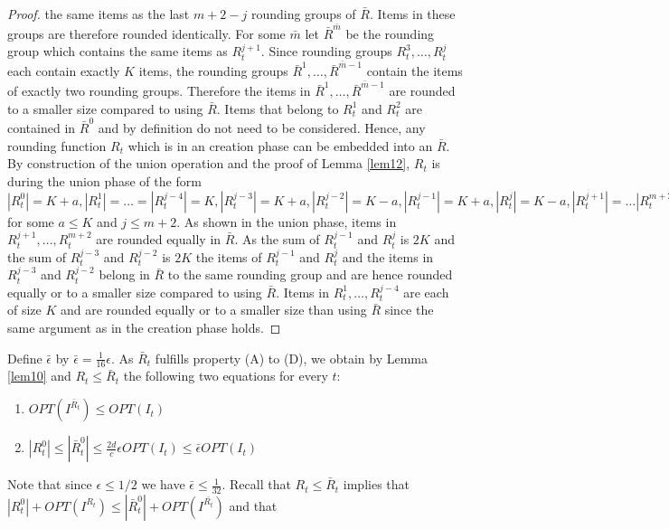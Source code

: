 \documentclass[a4paper,11pt]{article}
\begin{document}
\begin{proof}
	the same items as the last $m+2 - j$ rounding groups of $\bar{R}$.
	Items in these groups are therefore rounded identically.
	For some $\bar{m}$ let $\bar{R}^{\bar{m}}$ be the rounding group which contains the same items as $R_{t}^{j+1}$.
	Since rounding groups $R_{t}^3, \ldots ,R_{t}^j$ each contain exactly $K$ items, the rounding groups 
	$\bar{R}^1, \ldots ,\bar{R}^{\bar{m}- 1}$ contain the items of exactly two rounding groups. Therefore the items
	in $\bar{R}^1, \ldots ,\bar{R}^{\bar{m}- 1}$ are rounded to a smaller size compared to using
	$\bar{R}$. Items that belong to $R_{t}^1$ and $R_{t}^2$
	are contained in $\bar{R}^0$ and by definition do not need to be considered. Hence, any rounding function $R_t$
	which is in an creation phase can be embedded into an $\bar{R}$.
	By construction of the union operation and the proof of Lemma \ref{lem12}, $R_t$ is during the union phase
	of the form $|R_{t}^0| = K+a, |R_{t}^1| = \ldots = |R_{t}^{j-4}|= K,|R_{t}^{j-3}|= K+a, |R_{t}^{j-2}|= K-a,
	|R_{t}^{j-1}|= K+a, |R_{t}^{j}|= K-a, |R_{t}^{j+1}| = \ldots |R_{t}^{m+2}| = 2K$ for some $a \leq K$ and 
	$j \leq m+2$. As shown in the union phase, items in $R_{t}^{j+1},\ldots ,R_{t}^{m+2}$ are rounded equally
	in $\bar{R}$. As the sum of $R_{t}^{j-1}$ and $R_{t}^{j}$ is $2K$ and the sum of $R_{t}^{j-3}$ and $R_{t}^{j-2}$
	is $2K$ the items of $R_{t}^{j-1}$ and $R_{t}^{j}$ and the items in $R_{t}^{j-3}$ and $R_{t}^{j-2}$ 
	belong in $\bar{R}$ to the same rounding group and are hence rounded equally or to a smaller size compared to using
	$\bar{R}$.
	Items in $R_{t}^1,\ldots ,R_{t}^{j-4}$ are each of size $K$ and are rounded equally or to a smaller size 
	than using $\bar{R}$ since the same argument as in the creation phase holds.
\end{proof}
Define $\bar{\epsilon}$ by $\bar{\epsilon} = \frac{1}{16} \epsilon$.
As $\bar{R}_t$ fulfills property (A) to (D), we obtain by Lemma \ref{lem10} and $R_t \leq \bar{R}_t$ the following 
two equations for every $t$:
\begin{enumerate}
\item $\mathit{OPT}(I^{\bar{R}_t}) \leq \mathit{OPT}(I_t)$
\item $|R_{t}^0| \leq |\bar{R}_{t}^0| \leq \frac{2d}{c} \epsilon \mathit{OPT}(I_t) \leq 
\bar{\epsilon}\mathit{OPT}(I_t)$
\end{enumerate}
Note that since $\epsilon \leq 1/2$ we have $\bar{\epsilon} \leq \frac{1}{32}$. Recall that
$R_t \leq \bar{R}_t$ implies that 
$|R^{0}_t| + \mathit{OPT}(I^{R_t}) \leq |\bar{R}^{0}_t| + \mathit{OPT}(I^{\bar{R_t}})$ and that 
\end{document}
